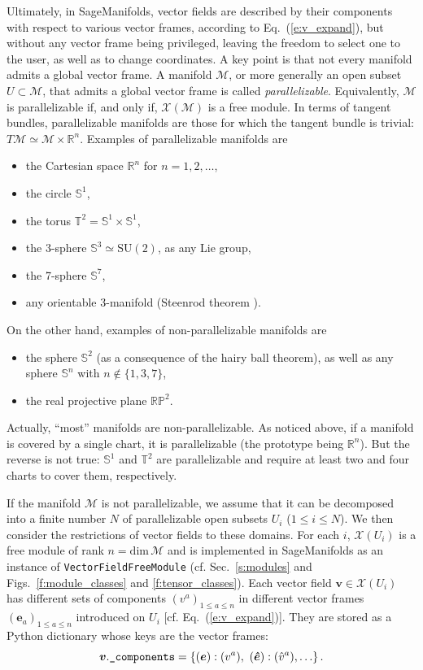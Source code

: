 \documentclass[a4paper]{jpconf}
\newcommand{\soft}[1]{\textsf{#1}}
\newcommand{\code}[1]{\texttt{#1}}
\newcommand{\SM}{\soft{SageManifolds}}
\newcommand{\be}{\begin{equation}}
\newcommand{\ee}{\end{equation}}
\newcommand{\w}[1]{\bm{#1}}
\begin{document}
Ultimately, in \SM{}, vector fields are described by their 
components with respect to various vector frames, according to 
Eq.~(\ref{e:v_expand}), but without any vector frame being privileged, 
leaving the freedom to select one to the user, as well as to change 
coordinates. A key point is that 
not every manifold admits a global vector frame. 
A manifold $\mathcal{M}$, or more generally an open subset $U\subset\mathcal{M}$,
that admits a global vector frame is called 
\emph{parallelizable}. Equivalently,
$\mathcal{M}$ is parallelizable if, and only if, $\mathscr{X}(\mathcal{M})$
is a free module. In terms of tangent bundles, 
parallelizable manifolds are those for which the tangent bundle is trivial:
$T\mathcal{M} \simeq \mathcal{M}\times \mathbb{R}^n$.
Examples of parallelizable manifolds are \cite{Lee13}
\begin{itemize}
\item the Cartesian space $\mathbb{R}^n$ for $n=1,2,\ldots$, 
\item the circle $\mathbb{S}^1$, 
\item the torus $\mathbb{T}^2 = \mathbb{S}^1\times \mathbb{S}^1$, 
\item the 3-sphere $\mathbb{S}^3 \simeq \mathrm{SU}(2)$, as any Lie group, 
\item the 7-sphere $\mathbb{S}^7$, 
\item any orientable 3-manifold (Steenrod theorem \cite{Steen51}).
\end{itemize}
On the other hand, examples of non-parallelizable manifolds are
\begin{itemize}
\item the sphere $\mathbb{S}^2$ (as a consequence of the hairy ball theorem),
as well as any sphere $\mathbb{S}^n$ with $n\not\in\{1,3,7\}$, 
\item the real projective plane $\mathbb{RP}^2$.
\end{itemize}
Actually, ``most'' manifolds are non-parallelizable. 
As noticed above, if a manifold is covered by a single chart, it is 
parallelizable (the prototype being $\mathbb{R}^n$). But the reverse is not 
true: $\mathbb{S}^1$ and $\mathbb{T}^2$ are parallelizable and require 
at least two and four charts to cover them, respectively. 


If the manifold $\mathcal{M}$ is not parallelizable,
we assume that it can be decomposed into a finite number $N$
of parallelizable open subsets $U_i$ ($1\leq i \leq N$).
We then consider the restrictions of vector fields to these domains.
For each $i$, $\mathscr{X}(U_i)$ is a free module of rank $n=\mathrm{dim}\, \mathcal{M}$ and is implemented in \SM{} as an instance of 
\code{VectorFieldFreeModule} (cf. Sec.~\ref{s:modules} and Figs.~\ref{f:module_classes}
and \ref{f:tensor_classes}). 
Each vector field $\w{v}\in  \mathscr{X}(U_i)$ has different sets
of components $(v^a)_{1\leq a\leq n}$ in different vector frames 
$(\w{e}_a)_{1\leq a \leq n}$ introduced on $U_i$ [cf. Eq.~(\ref{e:v_expand})]. They are stored
as a Python dictionary whose keys are the vector frames:
\be
\w{v}.\mbox{\texttt{\_components}} = \left\{ (\w{e}): (v^a),
\ (\w{\hat e}): ({\hat v}^a), \ldots \right\}. 
\ee
\end{document}
